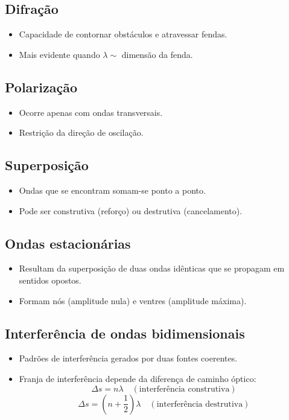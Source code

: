 \documentclass[a4paper,12pt]{article}
\begin{document}
\begin{multicols}{2}
\subsection{Difração}
\begin{itemize}
    \item Capacidade de contornar obstáculos e atravessar fendas.
    \item Mais evidente quando $\lambda \sim$ dimensão da fenda.
\end{itemize}

\subsection{Polarização}
\begin{itemize}
    \item Ocorre apenas com ondas transversais.
    \item Restrição da direção de oscilação.
\end{itemize}

\subsection{Superposição}
\begin{itemize}
    \item Ondas que se encontram somam-se ponto a ponto.
    \item Pode ser construtiva (reforço) ou destrutiva (cancelamento).
\end{itemize}

\subsection{Ondas estacionárias}
\begin{itemize}
    \item Resultam da superposição de duas ondas idênticas que se propagam em sentidos opostos.
    \item Formam nós (amplitude nula) e ventres (amplitude máxima).
\end{itemize}

\subsection{Interferência de ondas bidimensionais}
\begin{itemize}
    \item Padrões de interferência gerados por duas fontes coerentes.
    \item Franja de interferência depende da diferença de caminho óptico:
    \[
        \Delta s = n\lambda \quad (\text{interferência construtiva})
    \]
    \[
        \Delta s = \left(n + \frac{1}{2}\right)\lambda \quad (\text{interferência destrutiva})
    \]
\end{itemize}


\end{multicols}
\end{document}
